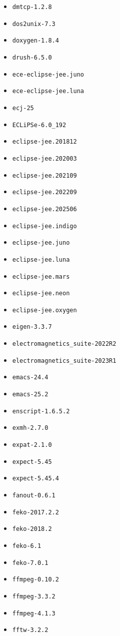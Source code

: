 \begin{multicols}{3}
\begin{itemize}
\item \verb|dmtcp-1.2.8|
\item \verb|dos2unix-7.3|
\item \verb|doxygen-1.8.4|
\item \verb|drush-6.5.0|
\item \verb|ece-eclipse-jee.juno|
\item \verb|ece-eclipse-jee.luna|
\item \verb|ecj-25|
\item \verb|ECLiPSe-6.0_192|
\item \verb|eclipse-jee.201812|
\item \verb|eclipse-jee.202003|
\item \verb|eclipse-jee.202109|
\item \verb|eclipse-jee.202209|
\item \verb|eclipse-jee.202506|
\item \verb|eclipse-jee.indigo|
\item \verb|eclipse-jee.juno|
\item \verb|eclipse-jee.luna|
\item \verb|eclipse-jee.mars|
\item \verb|eclipse-jee.neon|
\item \verb|eclipse-jee.oxygen|
\item \verb|eigen-3.3.7|
\item \verb|electromagnetics_suite-2022R2|
\item \verb|electromagnetics_suite-2023R1|
\item \verb|emacs-24.4|
\item \verb|emacs-25.2|
\item \verb|enscript-1.6.5.2|
\item \verb|exmh-2.7.0|
\item \verb|expat-2.1.0|
\item \verb|expect-5.45|
\item \verb|expect-5.45.4|
\item \verb|fanout-0.6.1|
\item \verb|feko-2017.2.2|
\item \verb|feko-2018.2|
\item \verb|feko-6.1|
\item \verb|feko-7.0.1|
\item \verb|ffmpeg-0.10.2|
\item \verb|ffmpeg-3.3.2|
\item \verb|ffmpeg-4.1.3|
\item \verb|fftw-3.2.2|

\end{itemize}
\end{multicols}
